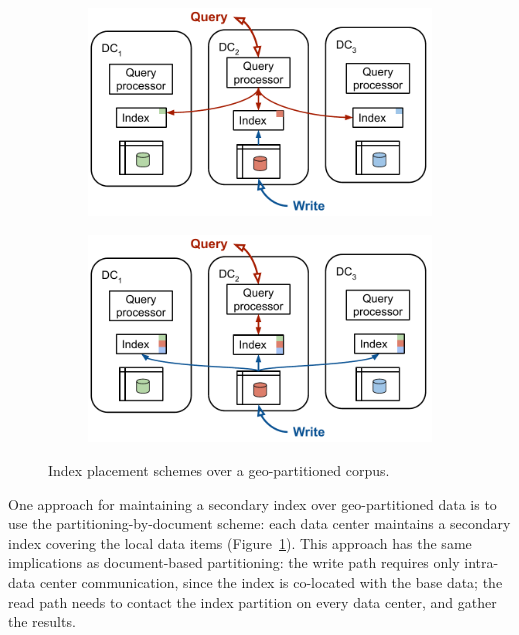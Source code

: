 \begin{figure}[H]
  \centering
  \begin{subfigure}[b]{0.48\textwidth}
    \centering
    \includegraphics[width=\textwidth]{./figures/design_space/geo_paritioning_local_index.pdf}
    \caption{}
    \label{fig:geo_paritioning_local_index}
  \end{subfigure}
  \hfill
  \begin{subfigure}[b]{0.48\textwidth}
    \centering
    \includegraphics[width=\textwidth]{./figures/design_space/geo_paritioning_global_indexes.pdf}
    \caption{}
    \label{fig:geo_paritioning_global_indexes}
  \end{subfigure}
  \caption{Index placement schemes over a geo-partitioned corpus.}
  \label{fig:index_placement_geo_partitioning}
\end{figure}

One approach for maintaining a secondary index over geo-partitioned data is to use the partitioning-by-document scheme:
each data center maintains a secondary index covering the local data items (Figure~\ref{fig:geo_paritioning_local_index}).
This approach has the same implications as document-based partitioning:
the write path requires only intra- data center communication, since the index is co-located with the base data;
the read path needs to contact the index partition on every data center, and gather the results.

